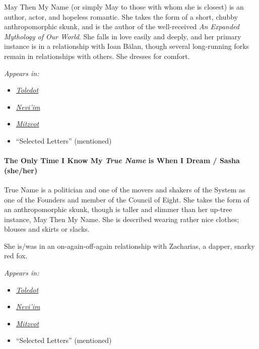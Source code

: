 May Then My Name (or simply May to those with whom she is closest) is an author, actor, and hopeless romantic. She takes the form of a short, chubby anthropomorphic skunk, and is the author of the well-received \emph{An Expanded Mythology of Our World}. She falls in love easily and deeply, and her primary instance is in a relationship with Ioan Bălan, though several long-running forks remain in relationships with others. She dresses for comfort.


\emph{Appears in:}

\begin{itemize}
\tightlist
\item
  \href{https://toledot.post-self.ink}{\emph{Toledot}}
\item
  \href{https://neviim.post-self.ink}{\emph{Nevi'im}}
\item
  \href{https://mitzvot.post-self.ink}{\emph{Mitzvot}}
\item
  ``Selected Letters'' (mentioned)
\end{itemize}

\paragraph{\texorpdfstring{The Only Time I Know My \emph{True Name} is When I Dream{ / Sasha} (she/her)}{The Only Time I Know My True Name is When I Dream / Sasha (she/her)}}

True Name is a politician and one of the movers and shakers of the System as one of the Founders and member of the Council of Eight. She takes the form of an anthropomorphic skunk, though is taller and slimmer than her up-tree instance, May Then My Name. She is described wearing rather nice clothes; blouses and skirts or slacks.

She is/was in an on-again-off-again relationship with Zacharias, a dapper, snarky red fox.



\emph{Appears in:}

\begin{itemize}
\tightlist
\item
  \href{https://toledot.post-self.ink}{\emph{Toledot}}
\item
  \href{https://neviim.post-self.ink}{\emph{Nevi'im}}
\item
  \href{https://mitzvot.post-self.ink}{\emph{Mitzvot}}
\item
  ``Selected Letters'' (mentioned)
\end{itemize}

